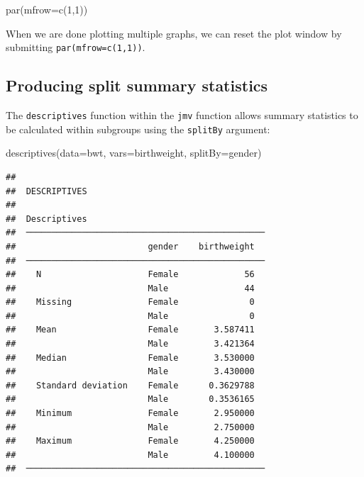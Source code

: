 \documentclass[
]{memoir}
\newenvironment{Shaded}{\begin{snugshade}}{\end{snugshade}}
\newcommand{\AttributeTok}[1]{\textcolor[rgb]{0.77,0.63,0.00}{#1}}
\newcommand{\DecValTok}[1]{\textcolor[rgb]{0.00,0.00,0.81}{#1}}
\newcommand{\FunctionTok}[1]{\textcolor[rgb]{0.00,0.00,0.00}{#1}}
\newcommand{\NormalTok}[1]{#1}
\begin{document}
\begin{Shaded}
\begin{Highlighting}[]
\FunctionTok{par}\NormalTok{(}\AttributeTok{mfrow=}\FunctionTok{c}\NormalTok{(}\DecValTok{1}\NormalTok{,}\DecValTok{1}\NormalTok{))}
\end{Highlighting}
\end{Shaded}

When we are done plotting multiple graphs, we can reset the plot window by submitting \texttt{par(mfrow=c(1,1))}.

\hypertarget{producing-split-summary-statistics}{%
\subsection{Producing split summary statistics}\label{producing-split-summary-statistics}}

The \texttt{descriptives} function within the \texttt{jmv} function allows summary statistics to be calculated within subgroups using the \texttt{splitBy} argument:

\begin{Shaded}
\begin{Highlighting}[]
\FunctionTok{descriptives}\NormalTok{(}\AttributeTok{data=}\NormalTok{bwt, }\AttributeTok{vars=}\NormalTok{birthweight, }\AttributeTok{splitBy=}\NormalTok{gender)}
\end{Highlighting}
\end{Shaded}

\begin{verbatim}
## 
##  DESCRIPTIVES
## 
##  Descriptives                                    
##  ─────────────────────────────────────────────── 
##                          gender    birthweight   
##  ─────────────────────────────────────────────── 
##    N                     Female             56   
##                          Male               44   
##    Missing               Female              0   
##                          Male                0   
##    Mean                  Female       3.587411   
##                          Male         3.421364   
##    Median                Female       3.530000   
##                          Male         3.430000   
##    Standard deviation    Female      0.3629788   
##                          Male        0.3536165   
##    Minimum               Female       2.950000   
##                          Male         2.750000   
##    Maximum               Female       4.250000   
##                          Male         4.100000   
##  ───────────────────────────────────────────────
\end{verbatim}
\end{document}
